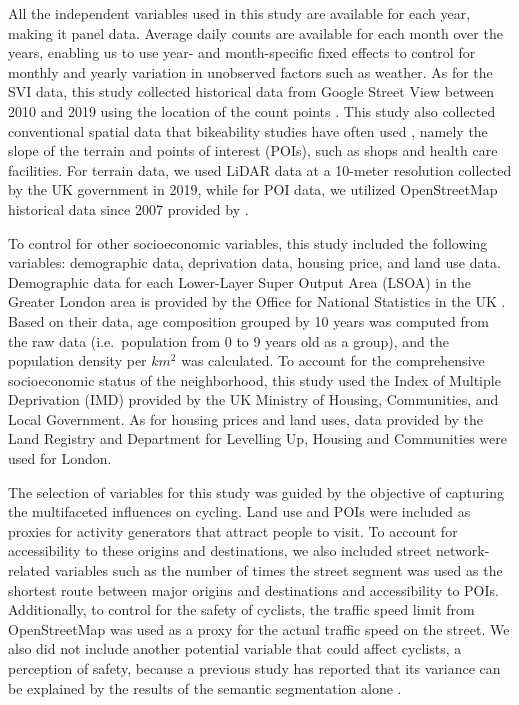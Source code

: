 \documentclass[preprint,12pt, authoryear]{elsarticle}
\begin{document}
All the independent variables used in this study are available for each year, making it panel data. Average daily counts are available for each month over the years, enabling us to use year- and month-specific fixed effects to control for monthly and yearly variation in unobserved factors such as weather. As for the SVI data, this study collected historical data from Google Street View between 2010 and 2019 using the location of the count points \citep{google_google_2023}. This study also collected conventional spatial data that bikeability studies have often used \citep{ito_assessing_2021a,winters_bike_2016}, namely the slope of the terrain and points of interest (POIs), such as shops and health care facilities. For terrain data, we used LiDAR data at a 10-meter resolution collected by the UK government in 2019, while for POI data, we utilized OpenStreetMap historical data since 2007 provided by \citep{raifer_oshdb_2021}.

To control for other socioeconomic variables, this study included the following variables: demographic data, deprivation data, housing price, and land use data. Demographic data for each Lower-Layer Super Output Area (LSOA) in the Greater London area is provided by the Office for National Statistics in the UK \citep{londondatastore_indices_2023}. Based on their data, age composition grouped by 10 years was computed from the raw data (i.e.\ population from 0 to 9 years old as a group), and the population density per $km^2$ was calculated.
To account for the comprehensive socioeconomic status of the neighborhood, this study used the Index of Multiple Deprivation (IMD) provided by the UK Ministry of Housing, Communities, and Local Government.
As for housing prices and land uses, data provided by the Land Registry and Department for Levelling Up, Housing and Communities were used for London.

The selection of variables for this study was guided by the objective of capturing the multifaceted influences on cycling. Land use and POIs were included as proxies for activity generators that attract people to visit. To account for accessibility to these origins and destinations, we also included street network-related variables such as the number of times the street segment was used as the shortest route between major origins and destinations and accessibility to POIs. Additionally, to control for the safety of cyclists, the traffic speed limit from OpenStreetMap was used as a proxy for the actual traffic speed on the street. We also did not include another potential variable that could affect cyclists, a perception of safety, because a previous study has reported that its variance can be explained by the results of the semantic segmentation alone \citep{beaucamp_whole_2022}.  
\end{document}
